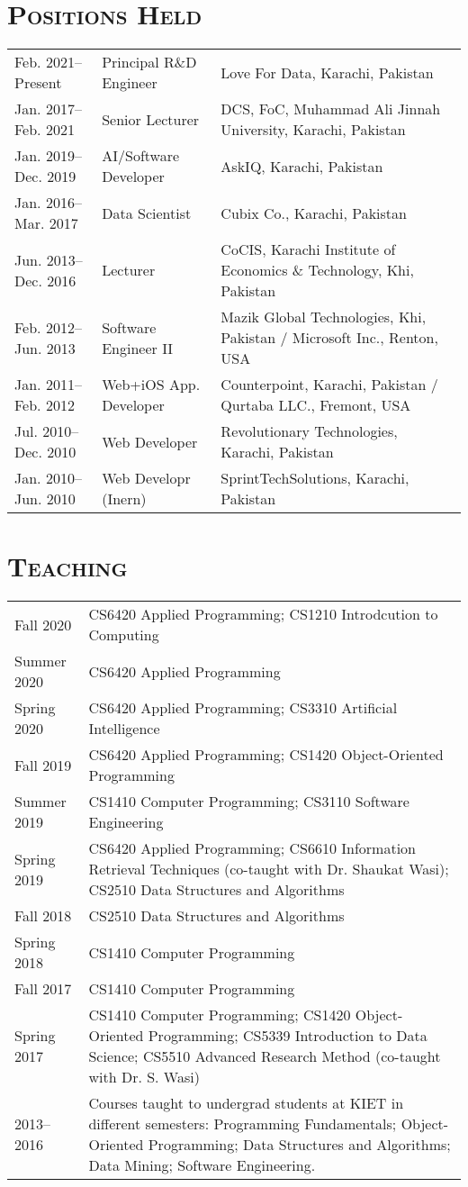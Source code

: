 \documentclass[a4paper, 10pt]{article}
\begin{document}
\section*{\normalfont\textsc{Positions Held}}
{
\tabcolsep=4pt
\begin{tabular}{lll}
Feb. 2021--Present & Principal R\&D Engineer & Love For Data, Karachi, Pakistan \\
Jan. 2017--Feb. 2021 & Senior Lecturer & DCS, FoC, Muhammad Ali Jinnah University, Karachi,   Pakistan \\
Jan. 2019--Dec. 2019 & AI/Software Developer & AskIQ, Karachi, Pakistan \\
Jan. 2016--Mar. 2017 & Data Scientist & Cubix Co., Karachi, Pakistan \\
Jun. 2013--Dec. 2016 & Lecturer & CoCIS, Karachi Institute of Economics \& Technology, Khi, Pakistan \\
Feb. 2012--Jun. 2013 & Software Engineer II & Mazik Global Technologies, Khi, Pakistan / Microsoft Inc., Renton, USA \\
Jan. 2011--Feb. 2012 & Web+iOS App. Developer & Counterpoint, Karachi, Pakistan / Qurtaba LLC., Fremont, USA \\
Jul. 2010--Dec. 2010 & Web Developer & Revolutionary Technologies, Karachi, Pakistan\\
Jan. 2010--Jun. 2010 & Web Developr (Inern) & SprintTechSolutions, Karachi, Pakistan
\end{tabular}
}



\section*{\normalfont\textsc{Teaching}}
{
\tabcolsep=4pt
\begin{tabular}{lp{16cm}}
Fall 2020 & CS6420 Applied Programming; CS1210 Introdcution to Computing\\
Summer 2020 & CS6420 Applied Programming \\
Spring 2020 & CS6420 Applied Programming; CS3310 Artificial Intelligence\\
Fall 2019 & CS6420 Applied Programming; CS1420 Object-Oriented Programming\\
Summer 2019 & CS1410 Computer Programming; CS3110 Software Engineering\\
Spring 2019 & CS6420 Applied Programming; CS6610 Information Retrieval Techniques (co-taught with Dr. Shaukat Wasi); CS2510 Data Structures and Algorithms\\
Fall 2018 & CS2510 Data Structures and Algorithms\\
Spring 2018 & CS1410 Computer Programming\\
Fall 2017 & CS1410 Computer Programming\\
Spring 2017 & CS1410 Computer Programming; CS1420 Object-Oriented Programming; CS5339 Introduction to Data Science; CS5510 Advanced Research Method (co-taught with Dr. S. Wasi)\\
2013--2016 & Courses taught to undergrad students at KIET in different semesters: Programming Fundamentals; Object-Oriented Programming; Data Structures and Algorithms; Data Mining; Software Engineering.
\end{tabular}
}
\end{document}
